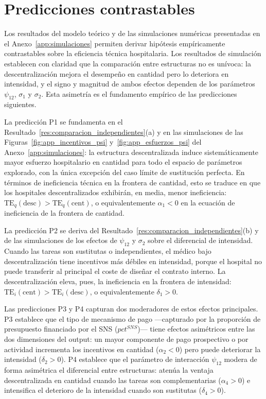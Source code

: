 \section{Predicciones contrastables}
\label{sec:predicciones}

Los resultados del modelo teórico y de las simulaciones numéricas presentadas en el Anexo~\ref{app:simulaciones} permiten derivar hipótesis empíricamente contrastables sobre la eficiencia técnica hospitalaria. Los resultados de simulación establecen con claridad que la comparación entre estructuras no es unívoca: la descentralización mejora el desempeño en cantidad pero lo deteriora en intensidad, y el signo y magnitud de ambos efectos dependen de los parámetros $\psi_{12}$, $\sigma_1$ y $\sigma_2$. Esta asimetría es el fundamento empírico de las predicciones siguientes.

La predicción P1 se fundamenta en el Resultado~\ref{res:comparacion_independientes}(a) y en las simulaciones de las Figuras~\ref{fig:app_incentivos_psi} y~\ref{fig:app_esfuerzos_psi} del Anexo~\ref{app:simulaciones}: la estructura descentralizada induce sistemáticamente mayor esfuerzo hospitalario en cantidad para todo el espacio de parámetros explorado, con la única excepción del caso límite de sustitución perfecta. En términos de ineficiencia técnica en la frontera de cantidad, esto se traduce en que los hospitales descentralizados exhibirán, en media, menor ineficiencia: $\mathrm{TE}_q(\text{desc})>\mathrm{TE}_q(\text{cent})$, o equivalentemente $\alpha_1<0$ en la ecuación de ineficiencia de la frontera de cantidad.

La predicción P2 se deriva del Resultado~\ref{res:comparacion_independientes}(b) y de las simulaciones de los efectos de $\psi_{12}$ y $\sigma_2$ sobre el diferencial de intensidad. Cuando las tareas son sustitutas o independientes, el médico bajo descentralización tiene incentivos más débiles en intensidad, porque el hospital no puede transferir al principal el coste de diseñar el contrato interno. La descentralización eleva, pues, la ineficiencia en la frontera de intensidad: $\mathrm{TE}_i(\text{cent})>\mathrm{TE}_i(\text{desc})$, o equivalentemente $\delta_1>0$.

Las predicciones P3 y P4 capturan dos moderadores de estos efectos principales. P3 establece que el tipo de mecanismo de pago ---capturado por la proporción de presupuesto financiado por el SNS ($pct^{SNS}$)--- tiene efectos asimétricos entre las dos dimensiones del output: un mayor componente de pago prospectivo o por actividad incrementa los incentivos en cantidad ($\alpha_2<0$) pero puede deteriorar la intensidad ($\delta_2>0$). P4 establece que el parámetro de interacción $\psi_{12}$ modera de forma asimétrica el diferencial entre estructuras: atenúa la ventaja descentralizada en cantidad cuando las tareas son complementarias ($\alpha_4>0$) e intensifica el deterioro de la intensidad cuando son sustitutas ($\delta_4>0$).

